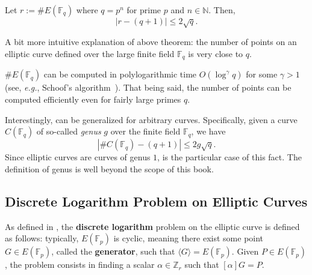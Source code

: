 \documentclass[../../book.tex]{subfiles}
\begin{document}
\begin{theorem}\label{th:hasse}
    Let $r := \#E(\mathbb{F}_{q})$ where $q=p^n$ for prime $p$ and $n \in \mathbb{N}$. Then,
    \begin{equation*}
        \left| r - (q+1) \right| \leq 2\sqrt{q}.
    \end{equation*}
\end{theorem}

A bit more intuitive explanation of above theorem: the number of points on an elliptic curve defined over the large finite field $\mathbb{F}_q$ is very close to $q$.

\begin{remark}
    $\#E(\mathbb{F}_q)$ can be computed in polylogarithmic time
    $O(\log^{\gamma}q)$ for some $\gamma>1$ (see, \textit{e.g.}, Schoof's algorithm~\cite{Schoof1995}). That being said, the number of
    points can be computed efficiently even for fairly large primes $q$.
\end{remark}

\begin{remark}
    Interestingly,  can be generalized for arbitrary curves.
    Specifically, given a curve $C(\mathbb{F}_q)$ of so-called \emph{genus} $g$ over the finite field $\mathbb{F}_q$, we have
    \begin{equation*}
        \left| \#C(\mathbb{F}_q) - (q+1) \right| \leq 2g\sqrt{q}.
    \end{equation*}
    Since elliptic curves are curves of genus $1$,  is the particular case of this fact.
    The definition of genus is well beyond the scope of this book.
\end{remark}

\subsection{Discrete Logarithm Problem on Elliptic Curves}
As defined in , the \textbf{discrete logarithm}
problem on the elliptic curve is defined as follows: typically, $E(\mathbb{F}_p)$ is
cyclic, meaning there exist some point $G \in E(\mathbb{F}_p)$, called the
\textbf{generator}, such that $\langle G \rangle = E(\mathbb{F}_p)$. Given $P
\in E(\mathbb{F}_p)$, the problem consists in finding a scalar $\alpha \in
\mathbb{Z}_r$ such that $[\alpha]G = P$. 
\end{document}
